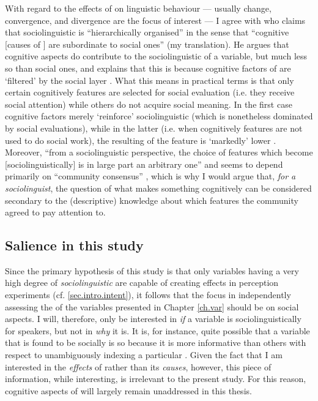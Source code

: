 With regard to the effects of  on linguistic behaviour --- usually change, convergence, and divergence are the focus of interest --- I agree with \textcite[17]{auer2014} who claims that sociolinguistic  is ``hierarchically organised'' in the sense that ``cognitive [causes of ] are subordinate to social ones'' (my translation).
He argues that cognitive aspects do contribute to the sociolinguistic  of a variable, but much less so than social ones, and explains that this is because cognitive factors of  are `filtered' by the social layer \parencite[cf.][18]{auer2014}.
What this means in practical terms is that only certain cognitively  features are selected for social evaluation (i.e. they receive social attention) while others do not acquire social meaning.
In the first case cognitive factors merely `reinforce' sociolinguistic  (which is nonetheless dominated by social evaluations), while in the latter (i.e. when cognitively  features are not used to do social work), the resulting  of the feature is `markedly' lower \parencite[cf.][18]{auer2014}.
Moreover, \enquote{from a sociolinguistic perspective, the choice of features which become [sociolinguistically]  is in large part an arbitrary one} and seems to depend primarily on \enquote{community consensus} \parencite[56]{llamasetal2017}, which is why I would argue that, \emph{for a sociolinguist}, the question of what makes something cognitively  can be considered secondary to the (descriptive) knowledge about which features the community agreed to pay attention to.

		\subsection{Salience in this study}
		\label{sec.sal.sal.study}

Since the primary hypothesis of this study is that only variables having a very high degree of \emph{sociolinguistic}  are capable of creating  effects in perception experiments (cf. \ref{sec.intro.intent}), it follows that the focus in independently assessing the  of the variables presented in Chapter \ref{ch.var} should be on social aspects.
I will, therefore, only be interested in \emph{if} a variable is sociolinguistically  for speakers, but not in \emph{why} it is.
It is, for instance, quite possible that a variable that is found to be socially  is so because it is more informative than others with respect to unambiguously indexing a particular .
Given the fact that I am interested in the \emph{effects} of  rather than its \emph{causes}, however, this piece of information, while interesting, is irrelevant to the present study.
For this reason, cognitive aspects of  will largely remain unaddressed in this thesis.

